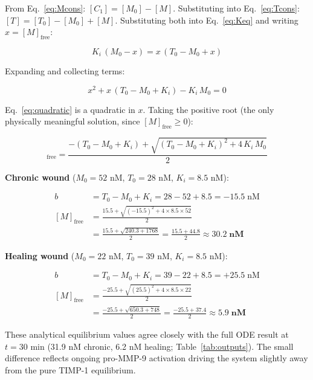 \documentclass[10pt,a4paper]{article}
\numberwithin{equation}{section}
\begin{document}
From Eq.~\eqref{eq:Mcons}: $[C_1] = [M_0] - [M]$. Substituting into
Eq.~\eqref{eq:Tcons}: $[T] = [T_0] - [M_0] + [M]$. Substituting both into
Eq.~\eqref{eq:Keq} and writing $x = [M]_{\text{free}}$:

\begin{equation*}
K_i\,(M_0 - x) = x\,(T_0 - M_0 + x)
\end{equation*}

Expanding and collecting terms:

\begin{equation}
x^2 + x\,(T_0 - M_0 + K_i) - K_i\,M_0 = 0
\label{eq:quadratic}
\end{equation}

Eq.~\eqref{eq:quadratic} is a quadratic in $x$. Taking the positive root (the only
physically meaningful solution, since $[M]_{\text{free}} \geq 0$):

\begin{equation}
[M]_{\text{free}} =
\frac{-(T_0 - M_0 + K_i) + \sqrt{(T_0 - M_0 + K_i)^2 + 4\,K_i\,M_0}}{2}
\label{eq:Mfree}
\end{equation}

\textbf{Chronic wound} ($M_0 = 52$ nM, $T_0 = 28$ nM, $K_i = 8.5$ nM):

\begin{align*}
b &= T_0 - M_0 + K_i = 28 - 52 + 8.5 = -15.5\;\text{nM} \\
[M]_{\text{free}} &=
  \frac{15.5 + \sqrt{(-15.5)^2 + 4 \times 8.5 \times 52}}{2} \\
  &= \frac{15.5 + \sqrt{240.3 + 1768}}{2}
   = \frac{15.5 + 44.8}{2}
   \approx \mathbf{30.2\;\text{nM}}
\end{align*}

\textbf{Healing wound} ($M_0 = 22$ nM, $T_0 = 39$ nM, $K_i = 8.5$ nM):

\begin{align*}
b &= T_0 - M_0 + K_i = 39 - 22 + 8.5 = +25.5\;\text{nM} \\
[M]_{\text{free}} &=
  \frac{-25.5 + \sqrt{(25.5)^2 + 4 \times 8.5 \times 22}}{2} \\
  &= \frac{-25.5 + \sqrt{650.3 + 748}}{2}
   = \frac{-25.5 + 37.4}{2}
   \approx \mathbf{5.9\;\text{nM}}
\end{align*}

These analytical equilibrium values agree closely with the full ODE result at
$t = 30$ min (31.9 nM chronic, 6.2 nM healing; Table~\ref{tab:outputs}). The small
difference reflects ongoing pro-MMP-9 activation driving the system slightly away
from the pure TIMP-1 equilibrium.
\end{document}
